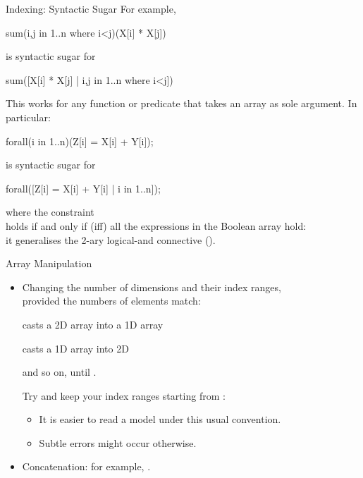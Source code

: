 \documentclass{cons-beamer}
\begin{document}
\begin{flashcardminizinc}
\begin{frame}[fragile]{Indexing: Syntactic Sugar}
  For example,
  \small 
  \begin{mznno}
    sum(i,j in 1..n where i<j)(X[i] * X[j])
  \end{mznno}\normalsize
  is syntactic sugar for
  \small
  \begin{mznno}
    sum([X[i] * X[j] | i,j in 1..n where i<j])
  \end{mznno}\normalsize\vfill
  This works for any function or predicate that takes an array as sole
  argument.  In particular:

  \small 
  \begin{mznno}
    forall(i in 1..n)(Z[i] = X[i] + Y[i]);
  \end{mznno}\normalsize 
  is syntactic sugar for
  \small 
  \begin{mznno}
    forall([Z[i] = X[i] + Y[i] | i in 1..n]);
  \end{mznno}\normalsize 
  where the  constraint \\
  holds if and only if (iff) all the expressions in the Boolean array
   hold: \\ it generalises the 2-ary logical-and
  connective (\mzninline{/\\}).
\end{frame}

\begin{frame}{Array Manipulation}\label{arrayNd}
  \begin{itemize}
  \item Changing the number of dimensions and their index ranges, \\
    provided the numbers of elements match: \vfill

     casts a 2D array
    into a 1D array \vfill
    
     casts a 1D array into
    2D \vfill

    and so on, until . \vfill

    \alert{Try and keep your index ranges starting from :}
    \vfill
    \begin{itemize}
    \item It is easier to read a model under this usual convention.
      \vfill
    \item Subtle errors might occur otherwise.
    \end{itemize}\vfill
  \item Concatenation: for example, \mzninline{[1,2] ++ [3,4]}.
  \end{itemize}
\end{frame}


\end{flashcardminizinc}
\end{document}
